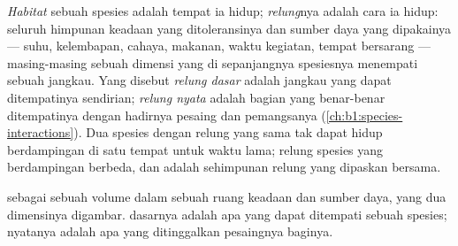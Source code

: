 \begin{definition}\label{def:b1:ecosystem-organization:niche}
\emph{Habitat} sebuah spesies adalah tempat ia hidup; \emph{relung}nya
adalah cara ia hidup: seluruh himpunan keadaan yang ditoleransinya dan
sumber daya yang dipakainya --- suhu, kelembapan, cahaya, makanan,
waktu kegiatan, tempat bersarang --- masing-masing sebuah dimensi yang
di sepanjangnya spesiesnya menempati sebuah jangkau. Yang disebut
\emph{relung dasar} adalah jangkau yang dapat ditempatinya sendirian;
\emph{relung nyata} adalah bagian yang benar-benar ditempatinya dengan
hadirnya pesaing dan pemangsanya
(\cref{ch:b1:species-interactions}). Dua spesies dengan relung yang
sama tak dapat hidup berdampingan di satu tempat untuk waktu lama;
relung spesies yang berdampingan berbeda, dan  adalah
sehimpunan relung yang dipaskan bersama.
\end{definition}

\begin{omfigure}

{\small {} sebagai sebuah volume dalam sebuah ruang keadaan dan
sumber daya, yang dua dimensinya digambar.  dasarnya adalah apa
yang dapat ditempati sebuah spesies;  nyatanya adalah apa yang
ditinggalkan pesaingnya baginya.}
\end{omfigure}

